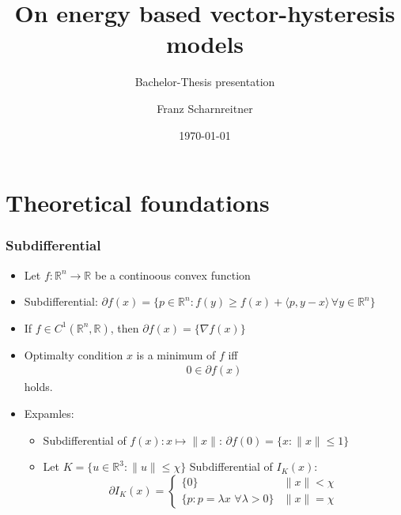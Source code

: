 \documentclass[utf8,aspectratio=169,ngerman,english]{beamer}
\begin{document}
\title{On energy based vector-hysteresis models}

\subtitle{Bachelor-Thesis presentation}

\author{Franz Scharnreitner}



\date{\today}

\maketitle


\begin{frame}
 \tableofcontents
\end{frame}

\section{Theoretical foundations}
\begin{frame}
 \frametitle{Subdifferential}

 \begin{itemize}
    \item Let $f: \mathbb R^n \to \mathbb R$ be a continoous convex function
    \item Subdifferential: $\partial f(x) = \{p \in \mathbb R^n: f(y) \geq f(x) + \langle p, y - x \rangle \, \forall y \in \mathbb R^n\}$
    \item If $f \in C^1(\mathbb R^n,\mathbb R)$, then $\partial f(x) = \{\nabla f(x)\}$
     \item Optimalty condition $x$ is a minimum of $f$ iff \begin{align}
                                                        0 \in \partial f(x)
                                                       \end{align}
        holds.
    \item Expamles:
     \begin{itemize}
      \item Subdifferential of $f(x): x \mapsto \|x\|$: $\partial f(0) = \{x : \|x\| \leq 1 \}$
      \item Let $K = \{u \in \mathbb R^3 : \|u\| \leq \chi \} $ Subdifferential of $I_K(x):$
      $$\partial I_K(x) = \begin{cases}\{0\} & \|x\| < \chi \\ \{p : p = \lambda x \,\, \forall \lambda > 0 \} & \|x\| = \chi \end{cases}$$
     \end{itemize}



 \end{itemize}

\end{frame}
\end{document}
